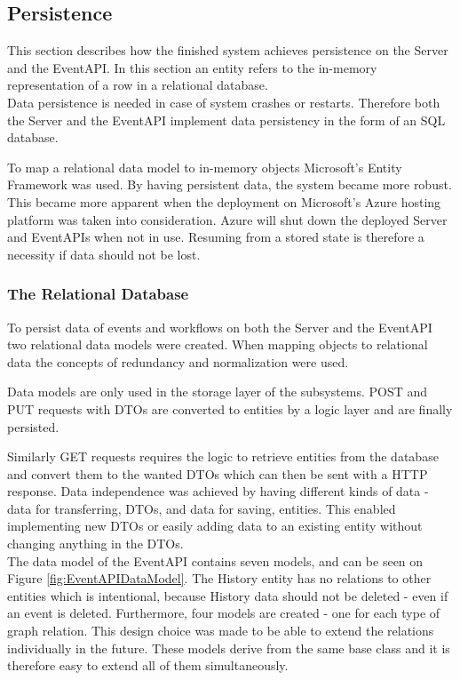 \subsection{Persistence}
This section describes how the finished system achieves persistence on the Server and the EventAPI. In this section an entity refers to the in-memory representation of a row in a relational database.\\

Data persistence is needed in case of system crashes or restarts. Therefore both the Server and the EventAPI implement data persistency in the form of an SQL database. 

To map a relational data model to in-memory objects Microsoft's Entity Framework was used. By having persistent data, the system became more robust. This became more apparent when the deployment on Microsoft’s Azure hosting platform was taken into consideration. Azure will shut down the deployed Server and EventAPIs when not in use. Resuming from a stored state is therefore a necessity if data should not be lost.  

\subsubsection{The Relational Database}
To persist data of events and workflows on both the Server and the EventAPI two relational data models were created. When mapping objects to relational data the concepts of redundancy and normalization were used.

Data models are only used in the storage layer of the subsystems. POST and PUT requests with DTOs are converted to entities by a logic layer and are finally persisted. 

Similarly GET requests requires the logic to retrieve entities from the database and convert them to the wanted DTOs which can then be sent with a HTTP response. 
Data independence was achieved by having different kinds of data - data for transferring,  DTOs, and data for saving, entities. This enabled implementing new DTOs or easily adding data to an existing entity without changing anything in the DTOs.\\

The data model of the EventAPI contains seven models, and can be seen on Figure \ref{fig:EventAPIDataModel}. The History entity has no relations to other entities which is intentional, because History data should not be deleted - even if an event is deleted. Furthermore, four models are created - one for each type of graph relation. This design choice was made to be able to extend the relations individually in the future. These models derive from the same base class and it is therefore easy to extend all of them simultaneously. 

